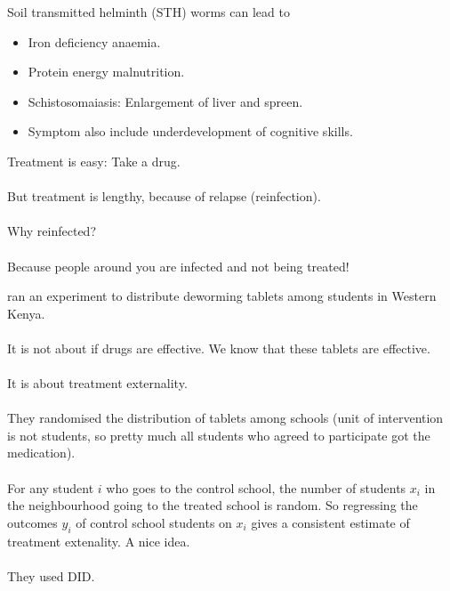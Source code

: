 \begin{frame}{}
Soil transmitted helminth (STH) worms can lead to
\begin{itemize}
\vspace{1.0ex}\setlength{\itemsep}{1.0ex}\setlength{\baselineskip}{12pt}
\item	Iron deficiency anaemia.
\item	Protein energy malnutrition.
\item	Schistosomaiasis: Enlargement of liver and spreen.
\item	Symptom also include underdevelopment of cognitive skills.
\end{itemize}

\vspace{2ex}
Treatment is easy: Take a drug. \\~\\

\pause
But treatment is lengthy, because of relapse (reinfection). \\~\\

\pause
Why reinfected? \\~\\
\pause
Because people around you are infected and not being treated!
\end{frame}

\begin{frame}{}
\citet{MiguelKremer2004} ran an experiment to distribute deworming tablets among students in Western Kenya.\\~\\

\pause
It is not about if drugs are effective. We know that these tablets are effective.\\~\\

\pause
It is about treatment externality.\\~\\

\pause
They randomised the distribution of tablets among schools (unit of intervention is not students, so pretty much all students who agreed to participate got the medication). \\~\\

\pause
For any student $i$ who goes to the control school, the number of students $x_{i}$ in the neighbourhood going to the treated school is random. So regressing the outcomes $y_{i}$ of control school students on $x_{i}$ gives a consistent estimate of treatment extenality. A nice idea.\\~\\
\pause
They used DID.
\end{frame}

